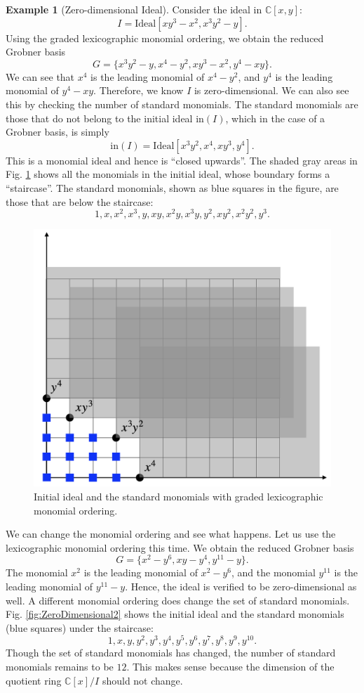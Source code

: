 \documentclass[
]{book}
\theoremstyle{definition}
\theoremstyle{definition}
\newtheorem{example}{Example}[chapter]
\theoremstyle{definition}
\theoremstyle{definition}
\theoremstyle{remark}
\begin{document}
\begin{example}[Zero-dimensional Ideal]
\protect\hypertarget{exm:ZeroDIdeal}{}\label{exm:ZeroDIdeal}Consider the ideal in \(\mathbb{C}[x,y]\):
\[
I = \mathrm{Ideal}[xy^3-x^2, x^3y^2 - y].
\]
Using the graded lexicographic monomial ordering, we obtain the reduced Grobner basis
\[
G = \{ x^3 y^2 - y, x^4 - y^2,  xy^3 - x^2, y^4 - xy \}.
\]
We can see that \(x^4\) is the leading monomial of \(x^4 - y^2\), and \(y^4\) is the leading monomial of \(y^4 - xy\). Therefore, we know \(I\) is zero-dimensional. We can also see this by checking the number of standard monomials. The standard monomials are those that do not belong to the initial ideal \(\mathrm{in}(I)\), which in the case of a Grobner basis, is simply
\[
\mathrm{in}(I) = \mathrm{Ideal}[x^3 y^2, x^4, xy^3, y^4].
\]
This is a monomial ideal and hence is ``closed upwards''. The shaded gray areas in Fig. \ref{fig:ZeroDimensional1} shows all the monomials in the initial ideal, whose boundary forms a ``staircase''. The standard monomials, shown as blue squares in the figure, are those that are below the staircase:
\[
1,x,x^2,x^3,y,xy,x^2 y, x^3 y, y^2, xy^2, x^2 y^2, y^3.
\]

\begin{figure}

{\centering \includegraphics[width=0.6\linewidth]{images/zero_dimensional_1} 

}

\caption{Initial ideal and the standard monomials with graded lexicographic monomial ordering.}\label{fig:ZeroDimensional1}
\end{figure}

We can change the monomial ordering and see what happens. Let us use the lexicographic monomial ordering this time. We obtain the reduced Grobner basis
\[
G = \{ x^2-y^6, xy - y^4, y^{11} - y \}.
\]
The monomial \(x^2\) is the leading monomial of \(x^2 - y^6\), and the monomial \(y^{11}\) is the leading monomial of \(y^11 - y\). Hence, the ideal is verified to be zero-dimensional as well. A different monomial ordering does change the set of standard monomials. Fig. \ref{fig:ZeroDimensional2} shows the initial ideal and the standard monomials (blue squares) under the staircase:
\[
1,x,y,y^2,y^3,y^4,y^5,y^6,y^7,y^8,y^9,y^{10}.
\]
Though the set of standard monomials has changed, the number of standard monomials remains to be \(12\). This makes sense because the dimension of the quotient ring \(\mathbb{C}[x]/I\) should not change.


\end{example}
\end{document}
